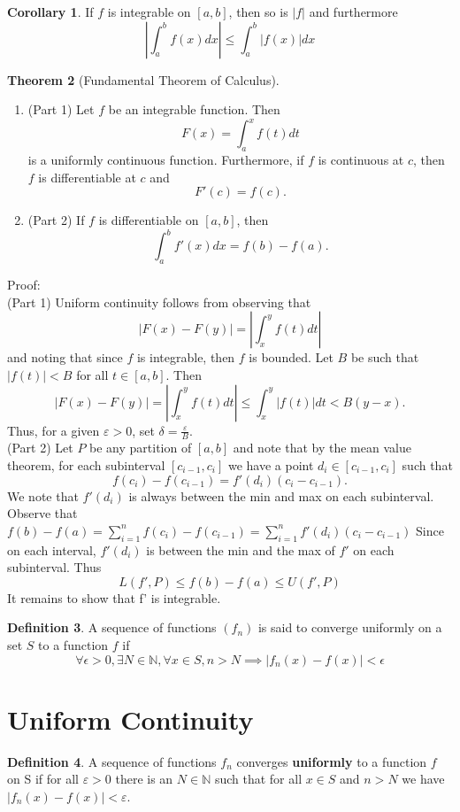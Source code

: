 \documentclass[12pt]{article}
\theoremstyle{definition}
\newtheorem{thm}{Theorem}
\newtheorem{cor}[thm]{Corollary}
\newtheorem{defn}[thm]{Definition}
\def\N{{\mathbb N}}
\begin{document}
\begin{cor}
    If $ f $ is integrable on $ [a,b] $, then so is $  |f| $ and furthermore
    $$ \left|\int_{a}^{b}f(x)   dx \right|\leq \int_{a}^{b} |f(x)|  dx   $$ 
\end{cor}

\begin{thm}[Fundamental Theorem of Calculus]
    \begin{enumerate}
	\item (Part 1) Let $ f  $ be an integrable function. Then
	    $$F(x)= \int_{a}^{x} f(t)  dt  $$ 
	    is a uniformly continuous function. Furthermore, if $f$ is continuous at $c$, then $ f $ is differentiable at $ c $ and
	    $$ F'(c)=f(c). $$ 
	\item (Part 2) If $ f $ is differentiable on $ [a,b] $, then 
	    $$ \int_{a}^{b} f'(x)  dx =f(b)-f(a). $$ 
    \end{enumerate}
\end{thm}
Proof:\\
(Part 1) Uniform continuity follows from observing that
$$ |F(x)-F(y)| = \left|\int_{x}^{y} f(t)  dt\right|  $$ 
and noting that since $ f $ is integrable, then $ f $ is bounded. Let $ B $ be such that $ |f(t)|<B $ for all $ t\in [a,b] $. Then 
$$ |F(x)-F(y)|= \left|\int_{x}^{y} f(t)  dt\right|\leq \int_{x}^{y} |f(t)|  dt < B(y-x). $$ 
Thus, for a given $ \varepsilon>0 $, set $ \delta= \frac{\varepsilon}{B} $.
\\

(Part 2) Let $ P $ be any partition of $ [a,b] $ and note that by the mean value theorem, for each subinterval $ [c_{i-1}, c_i] $ we have a point $ d_i\in [c_{i-1}, c_i]$ such that
$$ f(c_i)-f(c_{i-1}) = f'(d_i)(c_i-c_{i-1}). $$ 
We note that $ f'(d_i) $ is always between the min and max on each subinterval.
Observe that $ f(b)-f(a)= \sum_{i=1}^{n} f(c_i)-f(c_{i-1}) = \sum_{i=1}^{n} f'(d_i)(c_i-c_{i-1}) $
Since on each interval, $ f'(d_i) $  is between the min and the max of $  f' $ on each subinterval. Thus 
$$ L(f',P)\leq f(b)-f(a) \leq U(f',P)$$ 
It remains to show that f' is integrable.

\begin{defn}
A sequence of functions $ (f_n) $ is said to converge uniformly on a set $ S $ to a function $ f $ if
$$ \forall \epsilon>0,  \exists N\in \N, \forall x\in S, n>N \implies |f_n(x)-f(x)|<\epsilon $$ 
\end{defn}

\section*{Uniform Continuity}
\begin{defn}
    A sequence of functions $ f_n $ converges \textbf{uniformly} to a function $ f $ on S
if for all $ \varepsilon>0 $ there is an $ N\in \N $ such that for all $ x\in S $ and $ n>N $ we have $ |f_n(x)-f(x)|<\varepsilon $. 
\end{defn}
\end{document}

